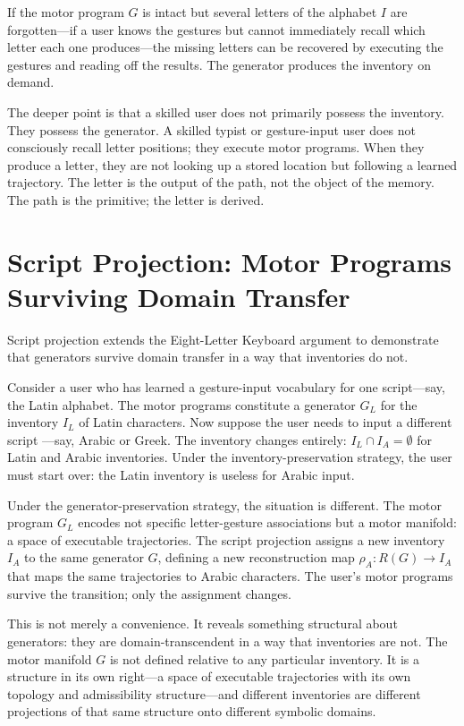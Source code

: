 \documentclass[12pt, oneside]{book}
\theoremstyle{flyxion}
\theoremstyle{definition}
\begin{document}
If the motor program $G$ is intact but several letters of the
alphabet $I$ are forgotten---if a user knows the gestures but
cannot immediately recall which letter each one produces---the
missing letters can be recovered by executing the gestures and
reading off the results. The generator produces the inventory
on demand.

The deeper point is that a skilled user does not primarily
possess the inventory. They possess the generator. A skilled
typist or gesture-input user does not consciously recall letter
positions; they execute motor programs. When they produce a
letter, they are not looking up a stored location but
following a learned trajectory. The letter is the output
of the path, not the object of the memory. The path is
the primitive; the letter is derived.

\section{Script Projection: Motor Programs Surviving Domain Transfer}

Script projection extends the Eight-Letter Keyboard argument
to demonstrate that generators survive domain transfer in a
way that inventories do not.

Consider a user who has learned a gesture-input vocabulary for
one script---say, the Latin alphabet. The motor programs
constitute a generator $G_L$ for the inventory $I_L$ of Latin
characters. Now suppose the user needs to input a different script
---say, Arabic or Greek. The inventory changes entirely:
$I_L \cap I_A = \emptyset$ for Latin and Arabic inventories.
Under the inventory-preservation strategy, the user must start
over: the Latin inventory is useless for Arabic input.

Under the generator-preservation strategy, the situation is
different. The motor program $G_L$ encodes not specific
letter-gesture associations but a motor manifold: a space of
executable trajectories. The script projection assigns a new
inventory $I_A$ to the same generator $G$, defining a new
reconstruction map $\rho_A : R(G) \to I_A$ that maps the
same trajectories to Arabic characters. The user's motor
programs survive the transition; only the assignment changes.

This is not merely a convenience. It reveals something
structural about generators: they are domain-transcendent
in a way that inventories are not. The motor manifold $G$
is not defined relative to any particular inventory. It is
a structure in its own right---a space of executable
trajectories with its own topology and admissibility
structure---and different inventories are different
projections of that same structure onto different symbolic
domains.
\end{document}
